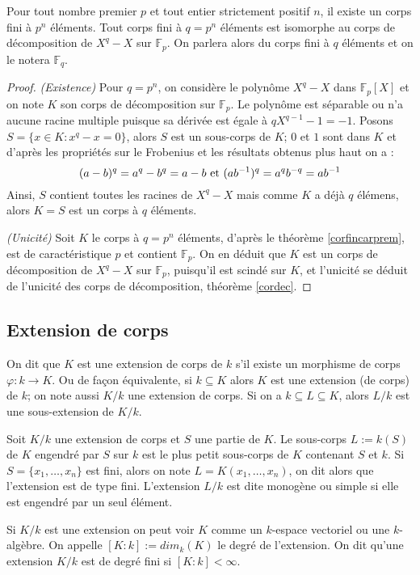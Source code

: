 \documentclass[a4paper]{article} %
\numberwithin{section}{part}
\numberwithin{equation}{section}
\newcommand\GF[1]{\mathbb{F}_{#1}}
\begin{document}
\begin{thm}
\label{thisomGF}
Pour tout nombre premier $p$ et tout entier strictement positif $n$, il existe 
un corps fini à $p^n$ éléments. Tout corps fini à $q = p^n$ éléments est 
isomorphe au corps de décomposition de $X^q - X$ sur $\GF{p}$. On parlera alors 
du corps fini à $q$ éléments et on le notera $\GF{q}$.
\end{thm}
\begin{proof}
\textit{(Existence)} Pour $q = p^n$, on considère le polynôme $X^q - X$ dans 
$\GF{p}[X]$ et on note $K$ son corps de décomposition sur $\GF{p}$. Le polynôme 
est séparable ou n'a aucune racine multiple puisque sa dérivée est égale à 
$qX^{q-1} - 1 = -1$. Posons $S = \lbrace x\in K : x^q - x = 0\rbrace$, alors $S$
est un sous-corps de $K$; $0$ et $1$ sont dans $K$ et d'après les propriétés sur
le Frobenius et les résultats obtenus plus haut on a :
\[(a - b)^q = a^q - b^q = a - b \textup{ et }(ab^{-1})^q = a^qb^{-q} = ab^{-1}\]
Ainsi, $S$ contient toutes les racines de $X^q - X$ mais comme $K$ a déjà $q$
élémens, alors $K = S$ est un corps à $q$ éléments.\par
\textit{(Unicité)} Soit $K$ le corps à $q = p^n$ éléments, d'après le théorème
\ref{corfincarprem}, est de caractéristique $p$ et contient $\GF{p}$. On en
déduit que $K$ est un corps de décomposition de $X^q - X$ sur $\GF{p}$,
puisqu'il est scindé sur $K$, et l'unicité se déduit de l'unicité des corps de
décomposition, théorème \ref{cordec}.
\end{proof}

\subsection{Extension de corps}
\label{defdegext}
On dit que $K$ est une extension de corps de $k$ s'il existe un morphisme de 
corps $\varphi : k \to K$. Ou de façon équivalente, si $k \subseteq K$ alors $K$
est une extension (de corps) de $k$; on note aussi $K/k$ une extension de corps.
Si on a $k\subseteq L \subseteq K$, alors $L/k$ est une sous-extension de
$K/k$.\par
Soit $K/k$ une extension de corps et $S$ une partie de $K$. Le sous-corps $L := 
k(S)$ de $K$ engendré par $S$ sur $k$ est le plus petit sous-corps de $K$ 
contenant $S$ et $k$. Si $S = \lbrace x_1,\dots,x_n \rbrace$ est fini, alors on 
note $L = K(x_1,\dots,x_n)$, on dit alors que l'extension est de type fini. 
L'extension $L/k$ est dite monogène ou simple si elle est engendré par un seul 
élément.\par
Si $K/k$ est une extension on peut voir $K$ comme un $k$-espace vectoriel ou une
$k$-algèbre. On appelle $[K:k] := dim_k(K)$ le degré de l'extension. On dit 
qu'une extension $K/k$ est de degré fini si $[K:k] < \infty$.\par
\end{document}
